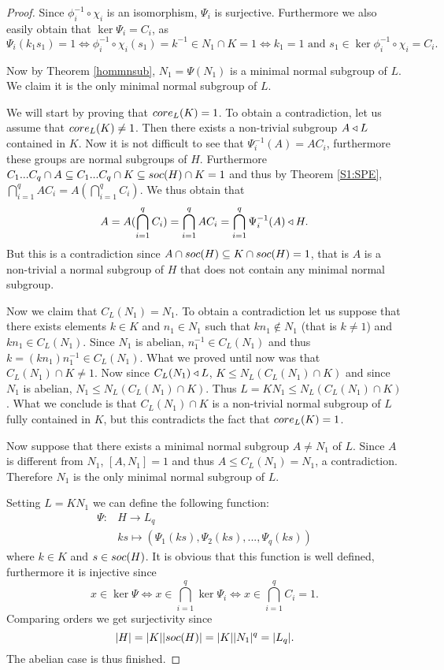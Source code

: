 \begin{proof}
    Since $\phi_i^{-1} \circ \chi_i$ is an isomorphism, $\Psi_i$ is surjective. Furthermore we also easily obtain that $\ker \Psi_i = C_i$, as 
    $$
    \Psi_i(k_1s_1) = 1 \iff \phi_i^{-1} \circ \chi_i(s_1) = k^{-1}  \in N_1 \cap K = 1 \iff k_1 = 1 \text{ and } s_1 \in \ker{\phi_i^{-1} \circ \chi_i} = C_i.
    $$ 
    
    Now by Theorem \ref{hommnsub}, $N_1 = \Psi(N_1)$ is a minimal normal subgroup of $L$. We claim it is the only minimal normal subgroup of $L$.
    
    We will start by proving that $\core[L]{K} = 1$.
    To obtain a contradiction, let us assume that $\core[L]{K} \ne 1$. 
    Then there exists a non-trivial subgroup $A \nsub L$ contained in $K$.
    Now it is not difficult to see that $\Psi_i^{-1}(A) = AC_i$, furthermore these groups are normal subgroups of $H$. Furthermore $C_1...C_q \cap A \subseteq C_1...C_q \cap K \subseteq \soc{H} \cap K = 1$ and thus by Theorem
    \ref{S1:SPE}, $\bigcap_{i=1}^q AC_i = A(\bigcap_{i=1}^q C_i)$. We thus obtain that 
    $$
    A = A(\bigcap_{i=1}^q C_i) = \bigcap_{i=1}^q AC_i = \bigcap_{i=1}^{q}\Psi_i^{-1}(A) \nsub H.
    $$
    But this is a contradiction since $A \cap \soc{H} \subseteq K \cap \soc{H} = 1$, that is $A$ is a non-trivial a normal subgroup of $H$ that does not contain any minimal normal subgroup.
    
    Now we claim that $C_L(N_1) = N_1$. To obtain a contradiction let us suppose that there exists elements $k \in K$ and $n_1 \in N_1$ such that $kn_1 \notin N_1$ (that is $k \ne 1$) and $kn_1 \in C_L(N_1)$. Since $N_1$ is abelian, $n_1^{-1} \in C_L(N_1)$ and thus $k = (kn_1)n_1^{-1} \in C_L(N_1)$. What we proved until now was that $C_L(N_1) \cap K \ne 1$. Now since $C_L(N_1) \nsub L$, $K \le N_L(C_L(N_1) \cap K)$ and since $N_1$ is abelian, $N_1 \le N_L(C_L(N_1) \cap K)$. Thus $L = KN_1 \le N_L(C_L(N_1) \cap K)$. What we conclude is that $C_L(N_1) \cap K$ is a non-trivial normal subgroup of $L$ fully contained in $K$, but this contradicts the fact that $\core[L]{K} = 1$.

    Now suppose that there exists a minimal normal subgroup $A \ne N_1$ of $L$. Since $A$ is different from $N_1$,
    $[A,N_1] = 1$ and thus $A \le C_L(N_1) = N_1$, a contradiction. Therefore $N_1$ is the only minimal normal subgroup of $L$.   

    Setting $L=KN_1$ we can define the following function:
    \begin{align*}
        \Psi \colon &H \longrightarrow L_q \\
                 &ks \mapsto  (\Psi_1(ks),\Psi_2(ks),...,\Psi_q(ks))
    \end{align*}
    where $k \in K$ and $s \in \soc H$. 
    It is obvious that this function is well defined, furthermore it is injective since 
    $$
    x \in \ker \Psi \iff x \in \bigcap_{i=1}^{q} \ker \Psi_i
    \iff x \in \bigcap_{i=1}^{q} C_i = 1.
    $$
    Comparing orders we get surjectivity since 
    $$
    \card{H} = \card{K}\card{\soc{H}} = \card{K}\card{N_1}^q = \card{L_q}.
    $$ The abelian case is thus finished.


\end{proof}

